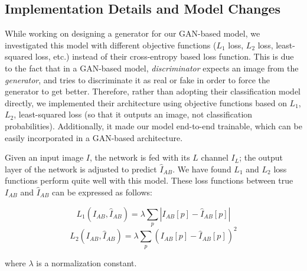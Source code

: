 \documentclass[10pt]{article}
\begin{document}
\subsection{\textbf{Implementation Details and Model Changes}}
While working on designing a generator for our GAN-based model, we investigated this model with different objective functions ($L_1$ loss, $L_2$ loss, least-squared loss, etc.) instead of their cross-entropy based loss function. This is due to the fact that in a GAN-based model, \textit{discriminator} expects an image from the \textit{generator}, 
and tries to discriminate it as real or fake in order to force the generator to get better.  
Therefore, rather than adopting their classification model directly, we implemented their architecture 
using objective functions based on $L_1$, $L_2$, least-squared loss (so that it outputs an image, not classification probabilities). Additionally, it made our model end-to-end trainable, which can be easily
incorporated in a GAN-based architecture. 

Given an input image $I$, the network is fed with its $L$ channel $I_L$; the output layer of the network is adjusted to predict $\hat{I}_{AB}$. We have found $L_1$ and $L_2$ loss functions perform quite well with this model. These loss functions between true $I_{AB}$ and $\hat{I}_{AB}$ can be expressed as follows:

\[ L_1 (I_{AB}, \hat{I}_{AB}) = \lambda \sum_p | I_{AB}[p] - \hat{I}_{AB}[p] | \]  
\[ L_2 (I_{AB}, \hat{I}_{AB}) = \lambda \sum_p ( I_{AB}[p] - \hat{I}_{AB}[p] )^2 \]  

\noindent where $\lambda$ is a normalization constant.
\end{document}
